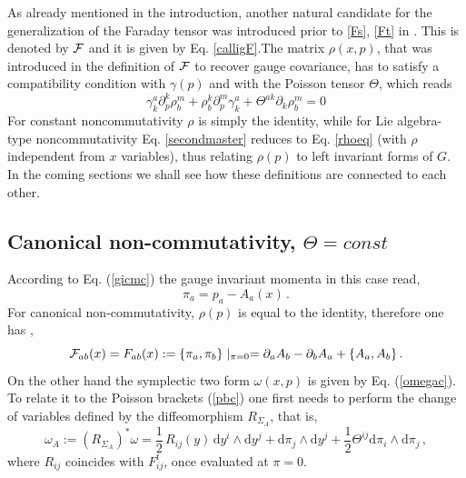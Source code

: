 \documentclass[12pt,a4paper]{article}
\numberwithin{equation}{section}
\theoremstyle{definition}
\newcommand{\dd}{\mathrm{d}}
\newcommand{\del}{\partial}
\newcommand{\be}{\begin{equation}}
\newcommand{\ee}{\end{equation}}
\newcommand{\eqn}{\eqref}
\begin{document}
As already mentioned in the introduction, another natural candidate for the generalization of the Faraday tensor was introduced prior to \eqn{Fs}, \eqn{Ft} in \cite{Kupriyanov:2021aet}. This is denoted by $\cal{F}$ and it is given by   Eq. \eqn{calligF}.{The matrix $\rho(x,p)$, that was introduced in the definition of  $\cal{F}$ to recover gauge covariance, has to satisfy a compatibility condition with $\gamma(p)$ and with the Poisson tensor $\Theta$, which reads \cite{Kupriyanov:2021aet}
\be\label{secondmaster}
\gamma_k^a\del_p^k\rho_b^m+\rho_b^k\del_p^m\gamma_k^a+\Theta^{ak}\del_k\rho_b^m=0
\ee
For constant noncommutativity $\rho$ is simply the identity, while for Lie algebra-type noncommutativity Eq. \eqn{secondmaster} reduces to Eq. \eqn{rhoeq} (with $\rho$ independent from $x$ variables), thus relating $\rho(p)$ to left invariant forms of $G$. 
In the coming sections we shall see how these definitions are connected to each other.}


\subsection{Canonical non-commutativity, \texorpdfstring{$\Theta=const$}{}}
According to Eq. (\ref{gicmc}) the gauge invariant momenta in this case read, 
\begin{equation}
\pi_a=p_a-A_a(x)\,.
\end{equation}
For canonical non-commutativity, $\rho(p)$ is equal to the identity, therefore  one has \cite{Kupriyanov:2020sgx},
\begin{equation}\label{pbc}
{\cal F}_{ab}(x)=F_{ab}(x):=\{\pi_a,\pi_b\}\mid_{\pi=0}=\partial_aA_b-\partial_bA_a+\{A_a,A_b\}\,.
\end{equation}
On the other hand the symplectic two form $\omega(x,p)$ is given by Eq. (\ref{omegac}). To relate it to the Poisson brackets (\ref{pbc}) one first  needs to perform the change of variables defined by the diffeomorphism $R_{\Sigma_{A}}$, that is, 
\begin{equation}\label{opc}
\omega_A:=(R_{\Sigma_A})^*\omega=\frac12\,R_{ij}(y)\,\dd y^i\wedge \dd y^j+\dd \pi_j\wedge \dd y^j + \frac12 \Theta^{ij}\dd\pi_i\wedge \dd\pi_j\,,
\end{equation}
where $R_{ij}$ coincides with $F^t_{ij}$, once evaluated at $\pi=0$. 
\end{document}
